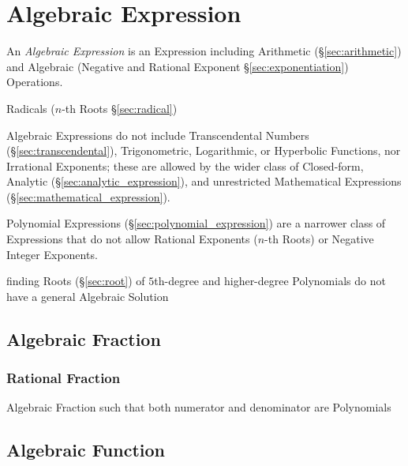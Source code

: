 \section{Algebraic Expression}\label{sec:algebraic_expression}

An \emph{Algebraic Expression} is an Expression including Arithmetic
(\S\ref{sec:arithmetic}) and Algebraic (Negative and Rational Exponent
\S\ref{sec:exponentiation}) Operations.

Radicals ($n$-th Roots \S\ref{sec:radical})

Algebraic Expressions do not include Transcendental Numbers
(\S\ref{sec:transcendental}), Trigonometric, Logarithmic, or Hyperbolic
Functions, nor Irrational Exponents; these are allowed by the wider class of
Closed-form, Analytic (\S\ref{sec:analytic_expression}), and unrestricted
Mathematical Expressions (\S\ref{sec:mathematical_expression}).

\fist Polynomial Expressions (\S\ref{sec:polynomial_expression}) are a narrower
class of Expressions that do not allow Rational Exponents ($n$-th Roots) or
Negative Integer Exponents.

finding Roots (\S\ref{sec:root}) of $5$th-degree and higher-degree
Polynomials do not have a general Algebraic Solution



\subsection{Algebraic Fraction}\label{sec:algebraic_fraction}

\subsubsection{Rational Fraction}\label{sec:rational_fraction}

Algebraic Fraction such that both numerator and denominator are Polynomials



\subsection{Algebraic Function}\label{sec:algebraic_function}

